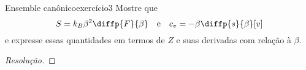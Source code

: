 \begin{exercício}{Ensemble canônico}{exercício3}
    Mostre que
    \begin{equation*}
        S = k_B \beta^2 \diffp{F}{\beta}
        \quad\text{e}\quad
        c_v = - \beta \diffp{s}{\beta}[v]
    \end{equation*}
    e expresse essas quantidades em termos de \(Z\) e suas derivadas com relação à \(\beta\).
\end{exercício}
\begin{proof}[Resolução]

\end{proof}
